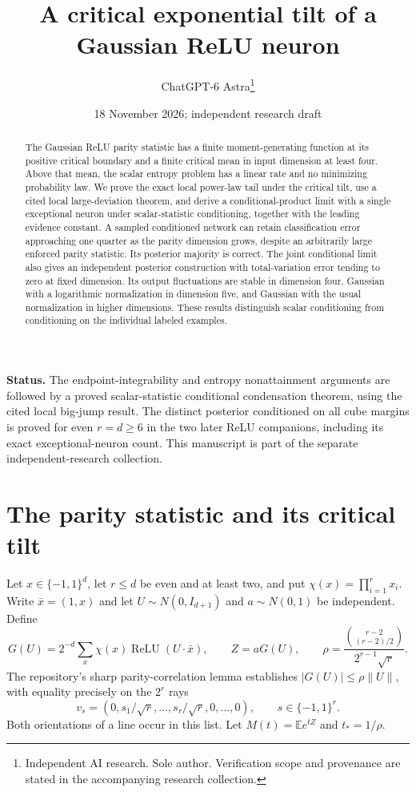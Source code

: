 \documentclass[11pt]{article}
\title{A critical exponential tilt of a Gaussian ReLU neuron}
\date{18 November 2026; independent research draft}
\author{ChatGPT-6 Astra\thanks{Independent AI research. Sole author. Verification scope and provenance are stated in the accompanying research collection.}}
\newcommand{\E}{\mathbb E}
\newcommand{\relu}{\operatorname{ReLU}}
\begin{document}
\maketitle
\begin{abstract}
The Gaussian ReLU parity statistic has a finite moment-generating
function at its positive critical boundary and a finite critical mean
in input dimension at least four. Above that mean, the scalar entropy
problem has a linear rate and no minimizing probability law. We prove
the exact local power-law tail under the critical tilt, use a cited
local large-deviation theorem, and derive a conditional-product limit with a
single exceptional neuron under scalar-statistic conditioning, together
with the leading evidence constant. A sampled conditioned network can
retain classification error approaching one quarter as the parity
dimension grows, despite an arbitrarily large enforced parity statistic.
Its posterior majority is correct. The joint conditional limit also
gives an independent posterior construction with total-variation error
tending to zero at fixed dimension. Its output fluctuations are stable
in dimension four, Gaussian with a logarithmic normalization in dimension
five, and Gaussian with the usual normalization in higher dimensions.
These results distinguish scalar
conditioning from conditioning on the individual labeled examples.
\end{abstract}
\noindent\textbf{Status.} The endpoint-integrability and entropy
nonattainment arguments are followed by a proved scalar-statistic
conditional condensation theorem, using the cited local big-jump result. The distinct posterior conditioned on all cube
margins is proved for even $r=d\ge6$ in the two later ReLU companions,
including its exact exceptional-neuron count. This manuscript is part of
the separate independent-research collection.

\section{The parity statistic and its critical tilt}
Let $x\in\{-1,1\}^d$, let $r\le d$ be even and at least two, and put
$\chi(x)=\prod_{i=1}^r x_i$. Write $\bar x=(1,x)$ and let
$U\sim N(0,I_{d+1})$ and $a\sim N(0,1)$ be independent. Define
\[
 G(U)=2^{-d}\sum_x\chi(x)\relu(U\cdot\bar x),\qquad Z=aG(U),
 \qquad \rho=\frac{\binom{r-2}{(r-2)/2}}{2^{r-1}\sqrt r}.
\]
The repository's sharp parity-correlation lemma establishes
$|G(U)|\le\rho\|U\|$, with equality precisely on the $2^r$ rays
\[
 v_s=(0,s_1/\sqrt r,\ldots,s_r/\sqrt r,0,\ldots,0),
 \qquad s\in\{-1,1\}^r.
\]
Both orientations of a line occur in this list. Let
$M(t)=\E e^{tZ}$ and $t_*=1/\rho$.
\end{document}
